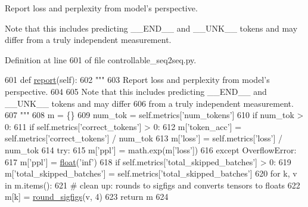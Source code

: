 \begin{DoxyVerb}Report loss and perplexity from model's perspective.

Note that this includes predicting __END__ and __UNK__ tokens and may differ
from a truly independent measurement.
\end{DoxyVerb}
 

Definition at line 601 of file controllable\+\_\+seq2seq.\+py.


\begin{DoxyCode}
601     \textcolor{keyword}{def }\hyperlink{namespaceprojects_1_1convai2_1_1eval__f1_a01a47b9c08dad189837a51f085defc45}{report}(self):
602         \textcolor{stringliteral}{"""}
603 \textcolor{stringliteral}{        Report loss and perplexity from model's perspective.}
604 \textcolor{stringliteral}{}
605 \textcolor{stringliteral}{        Note that this includes predicting \_\_END\_\_ and \_\_UNK\_\_ tokens and may differ}
606 \textcolor{stringliteral}{        from a truly independent measurement.}
607 \textcolor{stringliteral}{        """}
608         m = \{\}
609         num\_tok = self.metrics[\textcolor{stringliteral}{'num\_tokens'}]
610         \textcolor{keywordflow}{if} num\_tok > 0:
611             \textcolor{keywordflow}{if} self.metrics[\textcolor{stringliteral}{'correct\_tokens'}] > 0:
612                 m[\textcolor{stringliteral}{'token\_acc'}] = self.metrics[\textcolor{stringliteral}{'correct\_tokens'}] / num\_tok
613             m[\textcolor{stringliteral}{'loss'}] = self.metrics[\textcolor{stringliteral}{'loss'}] / num\_tok
614             \textcolor{keywordflow}{try}:
615                 m[\textcolor{stringliteral}{'ppl'}] = math.exp(m[\textcolor{stringliteral}{'loss'}])
616             \textcolor{keywordflow}{except} OverflowError:
617                 m[\textcolor{stringliteral}{'ppl'}] = \hyperlink{namespaceprojects_1_1controllable__dialogue_1_1make__control__dataset_aa2b7207688c641dbc094ab44eca27113}{float}(\textcolor{stringliteral}{'inf'})
618         \textcolor{keywordflow}{if} self.metrics[\textcolor{stringliteral}{'total\_skipped\_batches'}] > 0:
619             m[\textcolor{stringliteral}{'total\_skipped\_batches'}] = self.metrics[\textcolor{stringliteral}{'total\_skipped\_batches'}]
620         \textcolor{keywordflow}{for} k, v \textcolor{keywordflow}{in} m.items():
621             \textcolor{comment}{# clean up: rounds to sigfigs and converts tensors to floats}
622             m[k] = \hyperlink{namespaceparlai_1_1agents_1_1legacy__agents_1_1seq2seq_1_1utils__v0_af377ec61bfc0423461e7b409ffc883b9}{round\_sigfigs}(v, 4)
623         \textcolor{keywordflow}{return} m
624 
\end{DoxyCode}
